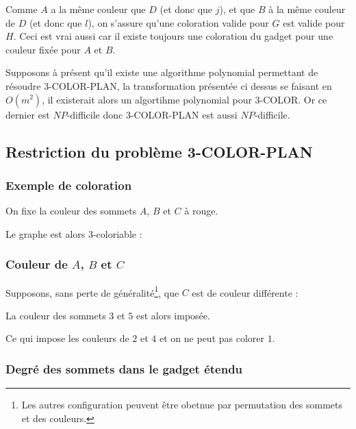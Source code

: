 Comme $A$ a la même couleur que $D$ (et donc que $j$), et que $B$ à la même couleur de $D$ (et donc
que $l$), on s'assure qu'une coloration valide pour $G$ est valide pour $H$. Ceci est vrai aussi
car il existe toujours une coloration du gadget pour une couleur fixée pour $A$ et $B$.

Supposons à présent qu'il existe une algorithme polynomial permettant de résoudre 3-COLOR-PLAN, la
transformation présentée ci dessus se faisant en $O(m^2)$, il existerait alors un algortihme
polynomial pour 3-COLOR. Or ce dernier est $NP$-difficile donc 3-COLOR-PLAN est aussi
$NP$-difficile.

\subsection{Restriction du problème 3-COLOR-PLAN}

\subsubsection{Exemple de coloration}

On fixe la couleur des sommets $A$, $B$ et $C$ à rouge.



Le graphe est alors 3-coloriable : 



\subsubsection{Couleur de $A$, $B$ et $C$}

Supposons, sans perte de généralité\footnote{Les autres configuration peuvent être obetnue par
permutation des sommets et des couleurs.}, que $C$ est de couleur différente :



La couleur des sommets $3$ et $5$ est alors imposée.



Ce qui impose les couleurs de $2$ et $4$ et on ne peut pas colorer $1$.



\subsubsection{Degré des sommets dans le gadget étendu}

